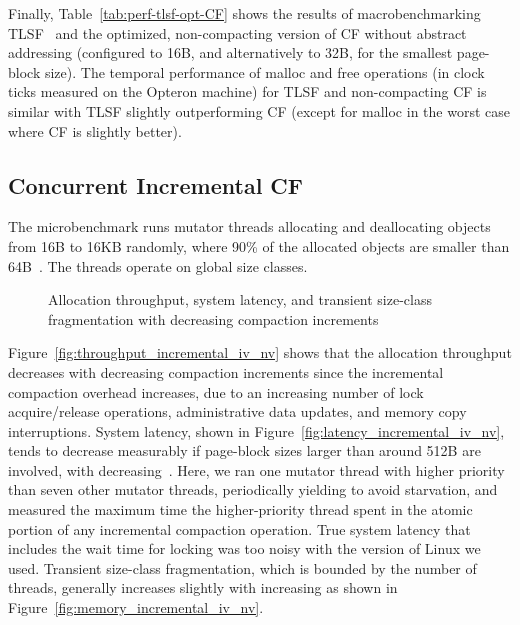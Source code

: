 \documentclass{amsart}
\begin{document}
Finally, Table~\ref{tab:perf-tlsf-opt-CF} shows the results of
macrobenchmarking TLSF~\cite{Mas1} and the optimized, non-compacting
version of CF without abstract addressing (configured to 16B, and
alternatively to 32B, for the smallest page-block size). The
temporal performance of malloc and free operations (in clock ticks
measured on the Opteron machine) for TLSF and non-compacting CF is
similar with TLSF slightly outperforming CF (except for malloc in the
worst case where CF is slightly better).



\subsection{Concurrent Incremental CF}\label{exp:ci}

The microbenchmark runs mutator threads allocating and deallocating objects
from 16B to 16KB randomly, where 90\% of the allocated objects are smaller than
64B~\cite{Johnstone98}.  The threads operate on global size classes.

\begin{figure*}
\begin{center}
\caption{Allocation throughput, system latency, and transient size-class fragmentation with decreasing compaction increments}
\label{fig:exp-inc}
\end{center}
\end{figure*}

Figure~\ref{fig:throughput_incremental_iv_nv} shows that the
allocation throughput decreases with decreasing compaction increments
 since the incremental compaction overhead increases, due to an
increasing number of lock acquire/release operations, administrative
data updates, and memory copy interruptions.  System latency, shown in
Figure~\ref{fig:latency_incremental_iv_nv}, tends to decrease
measurably if page-block sizes larger than around 512B are involved,
with decreasing~.  Here, we ran one mutator thread with higher
priority than seven other mutator threads, periodically yielding to
avoid starvation, and measured the maximum time the higher-priority
thread spent in the atomic portion of any incremental compaction
operation.  True system latency that includes the wait time for
locking was too noisy with the version of Linux we used.  Transient
size-class fragmentation, which is bounded by the number of threads,
generally increases slightly with increasing  as shown in
Figure~\ref{fig:memory_incremental_iv_nv}.
\end{document}
